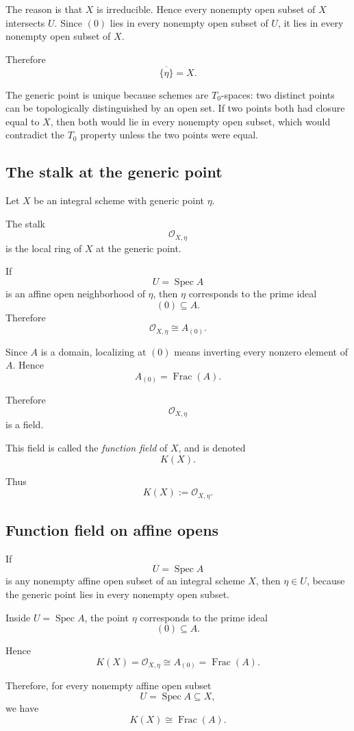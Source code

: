 \documentclass[12pt,a4paper]{article}
\DeclareMathOperator{\Spec}{Spec}
\newcommand{\OO}{\mathcal{O}}
\newcommand{\Frac}{\operatorname{Frac}}
\providecommand{\Spec}{\operatorname{Spec}}
\theoremstyle{notespace}
\begin{document}
The reason is that \(X\) is irreducible. Hence every nonempty open subset of \(X\) intersects \(U\). Since \((0)\) lies in every nonempty open subset of \(U\), it lies in every nonempty open subset of \(X\).

Therefore
\[
\overline{\{\eta\}}=X.
\]

The generic point is unique because schemes are \(T_0\)-spaces: two distinct points can be topologically distinguished by an open set. If two points both had closure equal to \(X\), then both would lie in every nonempty open subset, which would contradict the \(T_0\) property unless the two points were equal.

\subsection{The stalk at the generic point}

Let \(X\) be an integral scheme with generic point \(\eta\).

The stalk
\[
\OO_{X,\eta}
\]
is the local ring of \(X\) at the generic point.

If
\[
U=\Spec A
\]
is an affine open neighborhood of \(\eta\), then \(\eta\) corresponds to the prime ideal
\[
(0)\subseteq A.
\]
Therefore
\[
\OO_{X,\eta}\cong A_{(0)}.
\]

Since \(A\) is a domain, localizing at \((0)\) means inverting every nonzero element of \(A\). Hence
\[
A_{(0)}=\Frac(A).
\]

Therefore
\[
\OO_{X,\eta}
\]
is a field.

This field is called the \emph{function field} of \(X\), and is denoted
\[
K(X).
\]

Thus
\[
K(X):=\OO_{X,\eta}.
\]

\subsection{Function field on affine opens}

If
\[
U=\Spec A
\]
is any nonempty affine open subset of an integral scheme \(X\), then \(\eta\in U\), because the generic point lies in every nonempty open subset.

Inside \(U=\Spec A\), the point \(\eta\) corresponds to the prime ideal
\[
(0)\subseteq A.
\]

Hence
\[
K(X)=\OO_{X,\eta}\cong A_{(0)}=\Frac(A).
\]

Therefore, for every nonempty affine open subset
\[
U=\Spec A\subseteq X,
\]
we have
\[
K(X)\cong \Frac(A).
\]
\end{document}
